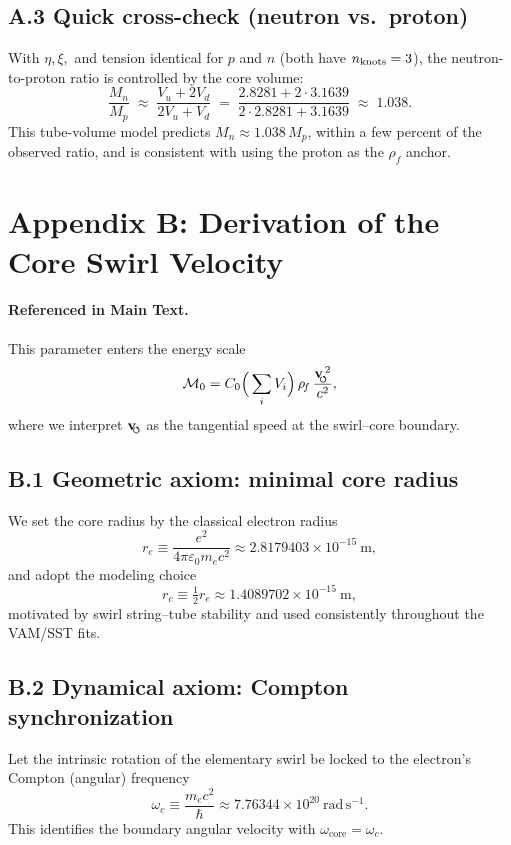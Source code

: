\documentclass[11pt, preprint,titlepage]{revtex4-2}
\newcommand{\rhoF}{\rho_{\!f}}      %
\newcommand{\swirlarrow}{\!\!\scriptsize\boldsymbol{\circlearrowleft}}
\newcommand{\vswirl}{\mathbf{v}_{\swirlarrow}}
\begin{document}
	\subsection*{A.3 Quick cross-check (neutron vs.\ proton)}
	With \(\eta,\xi,\) and tension identical for \(p\) and \(n\) (both have \(n_{\rm knots}=3\)),
	the neutron-to-proton ratio is controlled by the core volume:
	\[
		\frac{M_n}{M_p}\;\approx\;\frac{V_u + 2V_d}{2V_u + V_d}
		\;=\; \frac{2.8281 + 2\cdot 3.1639}{2\cdot 2.8281 + 3.1639}
		\;\approx\; 1.038.
	\]
	This tube-volume model predicts \(M_n \approx 1.038\,M_p\), within a few percent of the observed ratio, and is consistent with using the proton as the \(\rhoF\) anchor.

	\section*{Appendix B: Derivation of the Core Swirl Velocity}
	\label{sec:core_swirl_velocity}

	\paragraph{Referenced in Main Text.}
	This parameter enters the energy scale
	\[
		\mathcal{M}_0 = C_0 \Big(\sum_i V_i\Big)\,\rhoF\,\frac{\vswirl^{\,2}}{c^2},
	\]
	where we interpret \(\vswirl\) as the tangential speed at the swirl–core boundary.

	\subsection*{B.1 Geometric axiom: minimal core radius}
	We set the core radius by the classical electron radius
	\[
		r_e \equiv \frac{e^2}{4\pi \varepsilon_0 m_e c^2} \approx 2.8179403\times10^{-15}\ \mathrm{m},
	\]
	and adopt the modeling choice
	\[
		r_c \equiv \tfrac12 r_e \approx 1.4089702\times10^{-15}\ \mathrm{m},
	\]
	motivated by swirl string–tube stability and used consistently throughout the VAM/SST fits.

	\subsection*{B.2 Dynamical axiom: Compton synchronization}
	Let the intrinsic rotation of the elementary swirl be locked to the electron’s Compton (angular) frequency
	\[
		\omega_c \equiv \frac{m_e c^2}{\hbar} \approx 7.76344\times10^{20}\ \mathrm{rad\,s^{-1}} .
	\]
	This identifies the boundary angular velocity with \(\omega_{\text{core}}=\omega_c\).
\end{document}
